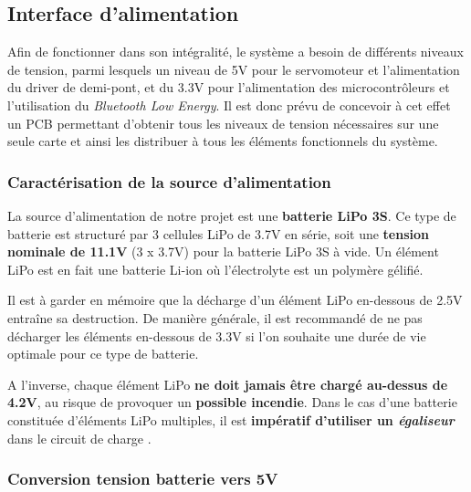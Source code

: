 \documentclass[a4paper,12pt]{report}
\begin{document}
		\vspace{-1em}
				 	
		\subsection{Interface d'alimentation}
		
		\vspace{-1em}
		
		Afin de fonctionner dans son intégralité, le système a besoin de différents niveaux de tension, parmi lesquels un niveau de 5V pour le servomoteur et l'alimentation du driver de demi-pont, et du 3.3V pour l'alimentation des microcontrôleurs et l'utilisation du \textit{Bluetooth Low Energy}. Il est donc prévu de concevoir à cet effet un PCB permettant d'obtenir tous les niveaux de tension nécessaires sur une seule carte et ainsi les distribuer à tous les éléments fonctionnels du système.
		
		\vspace{-1em}
		
			\subsubsection{Caractérisation de la source d'alimentation}
			
			\vspace{-1em}
			
			La source d'alimentation de notre projet est une \textbf{batterie LiPo 3S}. Ce type de batterie est structuré par 3 cellules LiPo de 3.7V en série, soit une \textbf{tension nominale de 11.1V} (3 x 3.7V) pour la batterie LiPo 3S à vide. Un élément LiPo est en fait une batterie Li-ion où l'électrolyte est un polymère gélifié.
			
			Il est à garder en mémoire que la décharge d'un élément LiPo en-dessous de 2.5V entraîne sa destruction. De manière générale, il est recommandé de ne pas décharger les éléments en-dessous de 3.3V si l'on souhaite une durée de vie optimale pour ce type de batterie. 
			
		A l'inverse, chaque élément LiPo \textbf{ne doit jamais être chargé au-dessus de 4.2V}, au risque de provoquer un \textbf{possible incendie}. Dans le cas d'une batterie constituée d'éléments LiPo multiples, il est \textbf{impératif d'utiliser un \textit{égaliseur}} dans le circuit de charge \cite{LiPo}.
		
		\vspace{-1em}
			
			\subsubsection{Conversion tension batterie vers 5V}
			\vspace{-1em}
				
\end{document}
